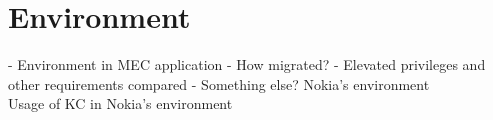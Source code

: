 \chapter{Environment}
\label{chapter:environment}

- Environment in MEC application
    - How migrated?
    - Elevated privileges and other requirements compared
    - Something else?
Nokia's environment \\
Usage of KC in Nokia's environment \\




